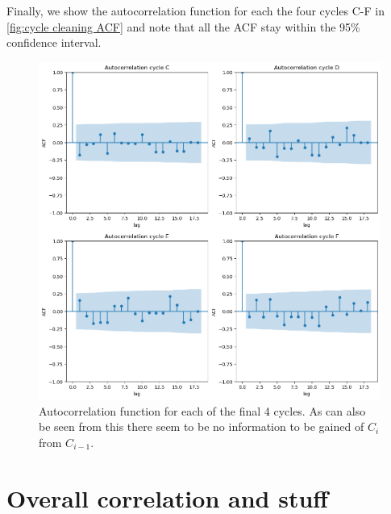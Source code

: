 \documentclass[../Thesis.tex]{subfiles}
\begin{document}
Finally, we show the autocorrelation function for each the four cycles C-F in \autoref{fig:cycle cleaning ACF} and note that all the ACF stay within the 95\% confidence interval.

\begin{figure}[h]
    \centering
    \includegraphics[width=0.8\linewidth]{figures/Multiple cycles data/Cleaning Autocorrelation.png}
    \caption{Autocorrelation function for each of the final 4 cycles. As can also be seen from this there seem to be no information to be gained of $C_i$ from $C_{i-1}$.}
    \label{fig:cycle cleaning ACF}
\end{figure}



\newpage
\section{Overall correlation and stuff}
\end{document}
